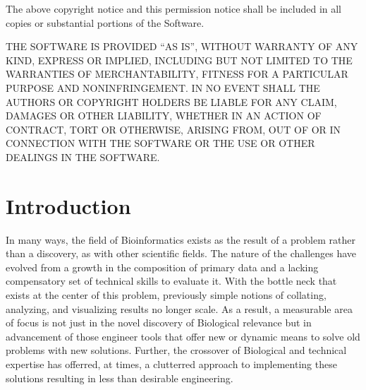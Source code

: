 \documentclass[10pt]{report}
\begin{document}
The above copyright notice and this permission notice shall be included in all copies or substantial portions of the Software.

THE SOFTWARE IS PROVIDED ``AS IS'', WITHOUT WARRANTY OF ANY KIND, EXPRESS OR IMPLIED, INCLUDING BUT NOT LIMITED TO THE WARRANTIES OF MERCHANTABILITY, FITNESS FOR A PARTICULAR PURPOSE AND NONINFRINGEMENT\@. IN NO EVENT SHALL THE AUTHORS OR COPYRIGHT HOLDERS BE LIABLE FOR ANY CLAIM, DAMAGES OR OTHER LIABILITY, WHETHER IN AN ACTION OF CONTRACT, TORT OR OTHERWISE, ARISING FROM, OUT OF OR IN CONNECTION WITH THE SOFTWARE OR THE USE OR OTHER DEALINGS IN THE SOFTWARE\@.

{}
%
%
%
%
%

\tableofcontents
{}
\listoftables
{}
\listoffigures

\newpage






\chapter{Introduction}
In many ways, the field of Bioinformatics exists as the result of a problem rather than a discovery, as with other scientific fields. The nature of the challenges have evolved from a growth in the composition of primary data and a lacking compensatory set of technical skills to evaluate it. With the bottle neck that exists at the center of this problem, previously simple notions of collating, analyzing, and visualizing results no longer scale. As a result, a measurable area of focus is not just in the novel discovery of Biological relevance but in advancement of those engineer tools that offer new or dynamic means to solve old problems with new solutions. Further, the crossover of Biological and technical expertise has offerred, at times, a clutterred approach to implementing these solutions resulting in less than desirable engineering.
\end{document}
